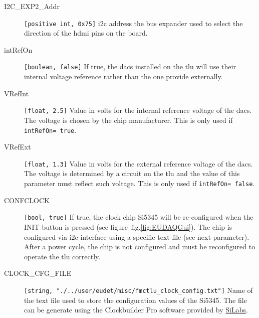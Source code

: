 \begin{description}
  \item[I2C\_EXP2\_Addr] \verb|[positive int, 0x75]| \gls{i2c} address the bus expander used to select the direction of the \gls{hdmi} pins on the board.
  \item[intRefOn] \verb|[boolean, false]| If true, the \gls{dac}s installed on the \gls{tlu} will use their internal voltage reference rather than the one provide externally.
  \item[VRefInt] \verb|[float, 2.5]| Value in volts for the internal reference voltage of the \gls{dac}s. The voltage is chosen by the chip manufacturer. This is only used if \verb|intRefOn= true|.
  \item[VRefExt] \verb|[float, 1.3]| Value in volts for the external reference voltage of the \gls{dac}s. The voltage is determined by a circuit on the \gls{tlu} and the value of this parameter must reflect such voltage. This is only used if \verb|intRefOn= false|.
  \item[CONFCLOCK] \verb|[bool, true]| If true, the clock chip Si5345 will be re-configured when the INIT button is pressed (see figure~fig.\ref{fig:EUDAQGui}). The chip is configured via \gls{i2c} interface using a specific text file (see next parameter). After a power cycle, the chip is not configured and must be reconfigured to operate the \gls{tlu} correctly.
  \item[CLOCK\_CFG\_FILE] \verb|[string, "./../user/eudet/misc/fmctlu_clock_config.txt"]| Name of the text file used to store the configuration values of the Si5345. The file can be generate using the Clockbuilder Pro software provided by \href{https://www.silabs.com/products/development-tools/software/clock}{SiLabs}.
\end{description}
